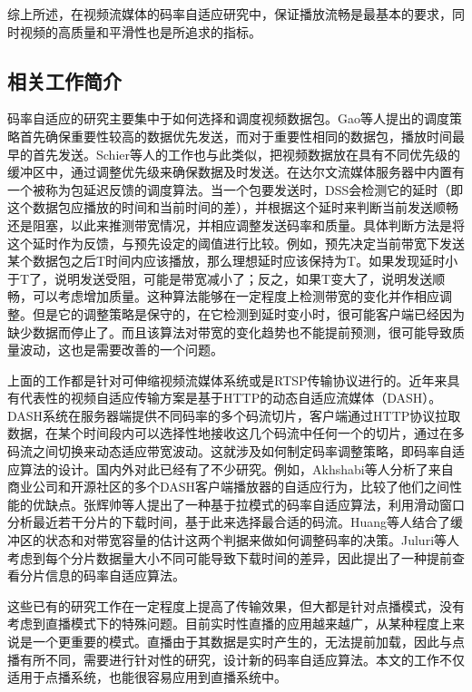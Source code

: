 综上所述，在视频流媒体的码率自适应研究中，保证播放流畅是最基本的要求，同时视频的高质量和平滑性也是所追求的指标。

\subsection{相关工作简介}

码率自适应的研究主要集中于如何选择和调度视频数据包。Gao等人\supercite{Gao2006}提出的调度策略首先确保重要性较高的数据优先发送，而对于重要性相同的数据包，播放时间最早的首先发送。Schier等人的工作\supercite{Schierl2010}也与此类似，把视频数据放在具有不同优先级的缓冲区中，通过调整优先级来确保数据及时发送。在达尔文流媒体服务器中内置有一个被称为包延迟反馈的调度算法。当一个包要发送时，DSS会检测它的延时（即这个数据包应播放的时间和当前时间的差），并根据这个延时来判断当前发送顺畅还是阻塞，以此来推测带宽情况，并相应调整发送码率和质量。具体判断方法是将这个延时作为反馈，与预先设定的阈值进行比较。例如，预先决定当前带宽下发送某个数据包之后T时间内应该播放，那么理想延时应该保持为T。如果发现延时小于T了，说明发送受阻，可能是带宽减小了；反之，如果T变大了，说明发送顺畅，可以考虑增加质量。这种算法能够在一定程度上检测带宽的变化并作相应调整。但是它的调整策略是保守的，在它检测到延时变小时，很可能客户端已经因为缺少数据而停止了。而且该算法对带宽的变化趋势也不能提前预测，很可能导致质量波动，这也是需要改善的一个问题。

上面的工作都是针对可伸缩视频流媒体系统或是RTSP传输协议进行的。近年来具有代表性的视频自适应传输方案是基于HTTP的动态自适应流媒体（DASH）\supercite{Sodagar2011}。DASH系统在服务器端提供不同码率的多个码流切片，客户端通过HTTP协议拉取数据，在某个时间段内可以选择性地接收这几个码流中任何一个的切片，通过在多码流之间切换来动态适应带宽波动。这就涉及如何制定码率调整策略，即码率自适应算法的设计。国内外对此已经有了不少研究。例如，Akhshabi等人\supercite{Akhshabi2012}分析了来自商业公司和开源社区的多个DASH客户端播放器的自适应行为，比较了他们之间性能的优缺点。张辉帅等人\supercite{Zhang2013}提出了一种基于拉模式的码率自适应算法，利用滑动窗口分析最近若干分片的下载时间，基于此来选择最合适的码流。Huang等人\supercite{Huang2015}结合了缓冲区的状态和对带宽容量的估计这两个判据来做如何调整码率的决策。Juluri\supercite{Juluri2015}等人考虑到每个分片数据量大小不同可能导致下载时间的差异，因此提出了一种提前查看分片信息的码率自适应算法。

这些已有的研究工作在一定程度上提高了传输效果，但大都是针对点播模式，没有考虑到直播模式下的特殊问题。目前实时性直播的应用越来越广，从某种程度上来说是一个更重要的模式。直播由于其数据是实时产生的，无法提前加载，因此与点播有所不同，需要进行针对性的研究，设计新的码率自适应算法。本文的工作不仅适用于点播系统，也能很容易应用到直播系统中。

